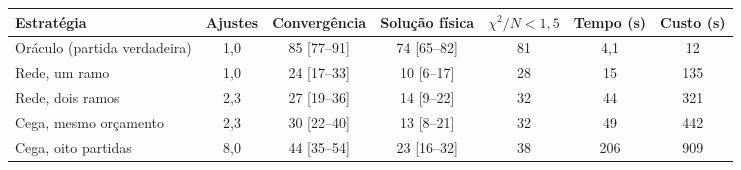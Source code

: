 \begin{tabular}{lcccccc}
	\toprule
	Estratégia & Ajustes & Convergência & Solução física & $\chi^2/N < 1{,}5$ & Tempo (s) & Custo (s) \\
	\midrule
	Oráculo (partida verdadeira) & 1{,}0 & 85 [77--91] & 74 [65--82] & 81 & 4{,}1 & 12 \\
	Rede, um ramo & 1{,}0 & 24 [17--33] & 10 [6--17] & 28 & 15 & 135 \\
	Rede, dois ramos & 2{,}3 & 27 [19--36] & 14 [9--22] & 32 & 44 & 321 \\
	Cega, mesmo orçamento & 2{,}3 & 30 [22--40] & 13 [8--21] & 32 & 49 & 442 \\
	Cega, oito partidas & 8{,}0 & 44 [35--54] & 23 [16--32] & 38 & 206 & 909 \\
	\bottomrule
\end{tabular}
